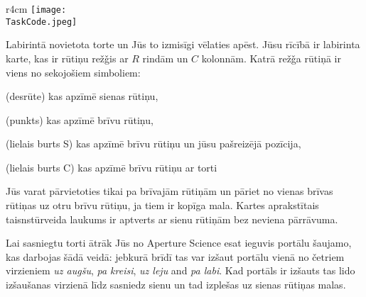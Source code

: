 \documentclass{boi2014-lv}
\renewcommand{\TaskCode}{portals}
\newcommand{\constant}[1]{{\tt #1}}
\begin{document}
    \begin{wrapfigure}[4]{r}{4cm}
        \vspace{-24pt}
		\texttt{[image: \\TaskCode.jpeg]}
	\end{wrapfigure}

		Labirintā novietota torte un Jūs to izmisīgi vēlaties apēst. Jūsu rīcībā ir labirinta karte, kas ir rūtiņu rež\v{g}is ar $R$ rindām un $C$ kolonnām. Katrā rež\v{g}a rūtiņā ir viens no sekojošiem simboliem:
    \begin{description}[itemindent=1pt]
    	\item[\constant{\#}] (desrūte) kas apzīmē sienas rūtiņu, %
        \item[\constant{.}] (punkts) kas apzīmē brīvu rūtiņu,%
        \item[\constant{S}] (lielais burts S) kas apzīmē brīvu rūtiņu un jūsu pašreizējā pozīcija,%
        \item[\constant{C}] (lielais burts C) kas apzīmē brīvu rūtiņu ar torti%
    \end{description}

		Jūs varat pārvietoties tikai pa brīvajām rūtiņām un pāriet no vienas brīvas rūtiņas uz otru brīvu rūtiņu, ja tiem ir kopīga mala. Kartes aprakstītais taisnstūrveida laukums ir aptverts ar sienu rūtiņām bez neviena pārrāvuma.

		Lai sasniegtu torti ātrāk Jūs no Aperture Science\texttrademark{} esat ieguvis portālu šaujamo, kas darbojas šādā veidā: jebkurā brīdī tas var izšaut portālu vienā no četriem virzieniem \emph{uz augšu}, \emph{pa kreisi}, \emph{uz leju} and \emph{pa labi}. Kad portāls ir izšauts tas lido izšaušanas virzienā līdz sasniedz sienu un tad izplešas uz sienas rūtiņas malas. 
\end{document}
